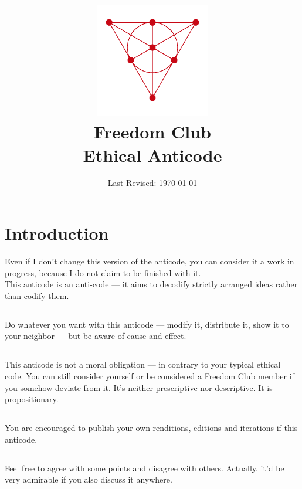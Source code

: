 \documentclass[letter]{article}
\begin{document}
\title{\includegraphics[width=5cm, height=5cm]{Fano_plane}\\
Freedom Club\\
  Ethical Anticode}
\date{Last Revised: \today}

\maketitle

\section*{Introduction}
Even if I don't change this version of the anticode, you can consider it a work in progress, because I do not claim to be finished with it.\\This anticode is an anti-code — it aims to decodify strictly arranged ideas rather than codify them.
\subsection{}
Do whatever you want with this anticode — modify it, distribute it, show it to your neighbor — but be aware of cause and effect.
\subsection{}
This anticode is not a moral obligation — in contrary to your typical ethical code. You can still consider yourself or be considered a Freedom Club member if you somehow deviate from it. It's neither prescriptive nor descriptive. It is propositionary.
\subsection{}
You are encouraged to publish your own renditions, editions and iterations if this anticode.
\subsection{}
Feel free to agree with some points and disagree with others. Actually, it'd be very admirable if you also discuss it anywhere.
\end{document}
